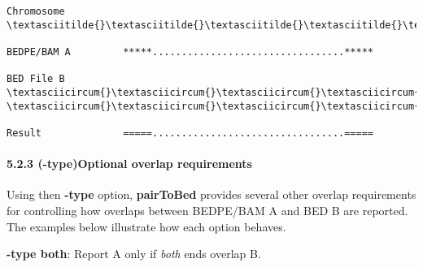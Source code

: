 \documentclass[letterpaper,10pt,english]{sphinxmanual}
\begin{document}
\begin{Verbatim}[commandchars=\\\{\}]
Chromosome  \textasciitilde{}\textasciitilde{}\textasciitilde{}\textasciitilde{}\textasciitilde{}\textasciitilde{}\textasciitilde{}\textasciitilde{}\textasciitilde{}\textasciitilde{}\textasciitilde{}\textasciitilde{}\textasciitilde{}\textasciitilde{}\textasciitilde{}\textasciitilde{}\textasciitilde{}\textasciitilde{}\textasciitilde{}\textasciitilde{}\textasciitilde{}\textasciitilde{}\textasciitilde{}\textasciitilde{}\textasciitilde{}\textasciitilde{}\textasciitilde{}\textasciitilde{}\textasciitilde{}\textasciitilde{}\textasciitilde{}\textasciitilde{}\textasciitilde{}\textasciitilde{}\textasciitilde{}\textasciitilde{}\textasciitilde{}\textasciitilde{}\textasciitilde{}\textasciitilde{}\textasciitilde{}\textasciitilde{}\textasciitilde{}\textasciitilde{}\textasciitilde{}\textasciitilde{}\textasciitilde{}\textasciitilde{}\textasciitilde{}\textasciitilde{}\textasciitilde{}\textasciitilde{}\textasciitilde{}\textasciitilde{}\textasciitilde{}\textasciitilde{}\textasciitilde{}\textasciitilde{}\textasciitilde{}\textasciitilde{}\textasciitilde{}\textasciitilde{}\textasciitilde{}\textasciitilde{}

BEDPE/BAM A         *****.................................*****

BED File B         \textasciicircum{}\textasciicircum{}\textasciicircum{}\textasciicircum{}\textasciicircum{}\textasciicircum{}\textasciicircum{}\textasciicircum{}                                          \textasciicircum{}\textasciicircum{}\textasciicircum{}\textasciicircum{}\textasciicircum{}\textasciicircum{}

Result              =====.................................=====
\end{Verbatim}


\paragraph{5.2.3 (-type)Optional overlap requirements}
\label{content/pairToBed:type-optional-overlap-requirements}
Using then \textbf{-type} option, \textbf{pairToBed} provides several other overlap requirements for controlling how
overlaps between BEDPE/BAM A and BED B are reported. The examples below illustrate how each
option behaves.

\textbf{-type both}: Report A only if \emph{both} ends overlap B.
\end{document}

